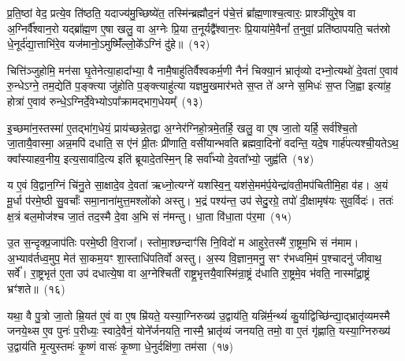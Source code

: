 प्र॒ति॒ष्ठां वेद॒ प्रत्ये॒व ति॑ष्ठति॒ यदाज्य॑मु॒च्छिष्ये॑त॒ तस्मि॑न्ब्रह्मौद॒नं प॑चे॒त्तं ब्रा᳚ह्म॒णाश्च॒त्वारः॒ प्राश्ञी॑युरे॒ष वा अ॒ग्निर्वै᳚श्वान॒रो यद्ब्रा᳚ह्म॒ण ए॒षा खलु॒ वा अ॒ग्नेः प्रि॒या त॒नूर्यद्वै᳚श्वान॒रः प्रि॒याया॑मे॒वैनां᳚ त॒नुवां॒ प्रति॑\-ष्ठापयति॒ चत॑स्रो धे॒नूर्द॑द्या॒त्ताभि॑रे॒व यज॑मानो॒\-ऽमुष्मिँ॑ल्लो॒के᳚\-ऽग्निं दु॑हे॥~(१२)

{\anuvakamend[{उपै॒तान्धारा॑यै॒ षट्च॑त्वारिꣳशच्च}]}%

चित्ति॑ञ्जुहोमि॒ मन॑सा घृ॒तेनेत्या॒हादा᳚भ्या॒ वै नामै॒षाहु॑तिर्वैश्वकर्म॒णी नैनं॑ चिक्या॒नं भ्रातृ॑व्यो दभ्नो॒त्यथो॑ दे॒वता॑ ए॒वाव॑ रु॒न्धे\-ऽग्ने॒ तम॒द्येति॑ प॒ङ्क्त्या जु॑होति प॒ङ्क्त्याहु॑त्या यज्ञमु॒खमार॑भते स॒प्त ते॑ अग्ने स॒मिधः॑ स॒प्त जि॒ह्वा इत्या॑ह॒ होत्रा॑ ए॒वाव॑ रुन्धे॒\-ऽग्निर्दे॒वेभ्यो\-ऽपा᳚क्रामद्भाग॒धेयम्᳚~(१३)

इ॒च्छमा॑न॒स्तस्मा॑ ए॒तद्भा॑ग॒धेयं॒ प्राय॑च्छन्ने॒तद्वा अ॒ग्नेर॑ग्निहो॒त्रमे॒तर्\mbox{}हि॒ खलु॒ वा ए॒ष जा॒तो यर्\mbox{}हि॒ सर्व॑श्चि॒तो जा॒तायै॒वास्मा॒ अन्न॒मपि॑ दधाति॒ स ए॑नं प्री॒तः प्री॑णाति॒ वसी॑यान्भवति ब्रह्मवा॒दिनो॑ वदन्ति॒ यदे॒ष गार्\mbox{}ह॑पत्यश्ची॒यते\-ऽथ॒ क्वा᳚स्याहव॒नीय॒ इत्य॒सावा॑दि॒त्य इति॑ ब्रूयादे॒तस्मि॒न् हि सर्वा᳚भ्यो दे॒वता᳚भ्यो॒ जुह्व॑ति~(१४)

य ए॒वं वि॒द्वान॒ग्निं चि॑नु॒ते सा॒क्षादे॒व दे॒वता॑ ऋध्नो॒त्यग्ने॑ यशस्वि॒न्॒ यश॑से॒मम॑र्प॒येन्द्रा॑वती॒मप॑चितीमि॒हा व॑ह। अ॒यं मू॒र्धा प॑रमे॒ष्ठी सु॒वर्चाः᳚ समा॒नाना॑मुत्त॒मश्लो॑को अस्तु। भ॒द्रं पश्य॑न्त॒ उप॑ सेदु॒रग्रे॒ तपो॑ दी॒क्षामृष॑यः सुव॒र्विदः॑। ततः॑ क्ष॒त्रं बल॒मोज॑श्च जा॒तं तद॒स्मै दे॒वा अ॒भि सं न॑मन्तु। धा॒ता वि॑धा॒ता प॑र॒मा~(१५)

उ॒त स॒न्दृक्प्र॒जा\-प॑तिः परमे॒ष्ठी वि॒राजा᳚। स्तोमा॒श्छन्दाꣳ॑सि नि॒विदो॑ म आहुरे॒तस्मै॑ रा॒ष्ट्रम॒भि सं न॑माम। अ॒भ्याव॑र्तध्व॒मुप॒ मेत॑ सा॒कम॒यꣳ शा॒स्ताधि॑\-पतिर्वो अस्तु। अ॒स्य वि॒ज्ञान॒मनु॒ सꣳ र॑भध्वमि॒मं प॒श्चादनु॑ जीवाथ॒ सर्वे᳚। रा॒ष्ट्रभृत॑ ए॒ता उप॑ दधात्ये॒षा वा अ॒ग्नेश्चिती॑ राष्ट्र॒भृत्तयै॒वास्मि॑न्रा॒ष्ट्रं द॑धाति रा॒ष्ट्रमे॒व भ॑वति॒ नास्मा᳚द्रा॒ष्ट्रं भ्रꣳ॑शते॥~(१६)

{\anuvakamend[{भा॒ग॒धेय॒ञ्जुह्व॑ति पर॒मा रा॒ष्ट्रं द॑धाति स॒प्त च॑}]}%

यथा॒ वै पु॒त्रो जा॒तो म्रि॒यत॑ ए॒वं वा ए॒ष म्रि॑यते॒ यस्या॒ग्निरुख्य॑ उ॒द्वाय॑ति॒ यन्नि॑र्म॒न्थ्यं॑ कु॒र्याद्विच्छि॑न्द्या॒द्भ्रातृ॑व्यमस्मै जनये॒थ्स ए॒व पुनः॑ प॒रीध्यः॒ स्वादे॒वैनं॒ योने᳚र्जनयति॒ नास्मै॒ भ्रातृ॑व्यं जनयति॒ तमो॒ वा ए॒तं गृ॑ह्णाति॒ यस्या॒ग्निरुख्य॑ उ॒द्वाय॑ति मृ॒त्युस्तमः॑ कृ॒ष्णं वासः॑ कृ॒ष्णा धे॒नुर्दक्षि॑णा॒ तम॑सा~(१७)

